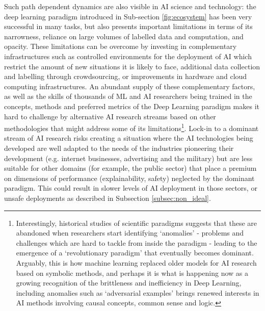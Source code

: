\documentclass[11pt]{article}
\begin{document}
Such path dependent dynamics are also visible in AI science and technology: the deep learning paradigm introduced in Sub-section \ref{fig:ecosystem} has been very successful in many tasks, but also presents important limitations in terms of its narrowness, reliance on large volumes of labelled data and computation, and opacity. These limitations can be overcome by investing in complementary infrastructures such as controlled environments for the deployment of AI which restrict the amount of new situations it is likely to face, additional data collection and labelling through crowdsourcing, or improvements in hardware and cloud computing infrastructures. An abundant supply of these complementary factors, as well as the skills of thousands of ML and AI researchers being trained in the concepts, methods and preferred metrics of the Deep Learning paradigm makes it hard to challenge by alternative AI research streams based on other methodologies that might address some of its limitations\footnote{Interestingly, historical studies of scientific paradigms suggests that these are abandoned when researchers start identifying  `anomalies' - problems and challenges which are hard to tackle from inside the paradigm - leading to the emergence of a `revolutionary paradigm' that eventually becomes dominant. Arguably, this is how machine learning replaced older models for AI research based on symbolic methods, and perhaps it is what is happening now as a growing recognition of the brittleness and inefficiency in Deep Learning, including anomalies such as `adversarial examples' brings renewed interests in AI methods involving causal concepts, common sense and logic.}. Lock-in to a dominant stream of AI research risks creating a situation where the AI technologies being developed are well adapted to the needs of the industries pioneering their development (e.g. internet businesses, advertising and the military) but are less suitable for other domains (for example, the public sector) that place a premium on dimensions of performance (explainability, safety) neglected by the dominant paradigm. This could result in slower levels of AI deployment in those sectors, or unsafe deployments as described in Subsection \ref{subsec:non_ideal}.
\end{document}
